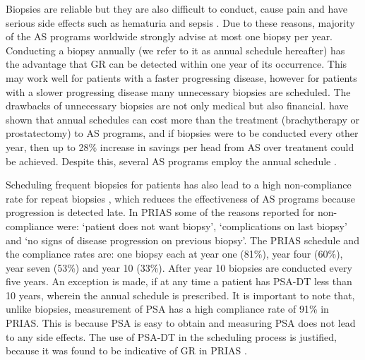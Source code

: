 Biopsies are reliable but they are also difficult to conduct, cause pain and have serious side effects such as hematuria and sepsis \citep{loeb2013systematic}. Due to these reasons, majority of the AS programs worldwide strongly advise at most one biopsy per year. Conducting a biopsy annually (we refer to it as annual schedule hereafter) has the advantage that GR can be detected within one year of its occurrence. This may work well for patients with a faster progressing disease, however for patients with a slower progressing disease many unnecessary biopsies are scheduled. The drawbacks of unnecessary biopsies are not only medical but also financial. \citet{keegan2012active} have shown that annual schedules can cost more than the treatment (brachytherapy or prostatectomy) to AS programs, and if biopsies were to be conducted every other year, then up to 28\% increase in savings per head from AS over treatment could be achieved. Despite this, several AS programs employ the annual schedule \citep{tosoian2011active,welty2015extended}.

Scheduling frequent biopsies for patients has also lead to a high non-compliance rate for repeat biopsies \citep{bokhorst2015compliance}, which reduces the effectiveness of AS programs because progression is detected late. In PRIAS some of the reasons reported for non-compliance were: \textquoteleft patient does not want biopsy\textquoteright, \textquoteleft complications on last biopsy\textquoteright{} and \textquoteleft no signs of disease progression on previous biopsy\textquoteright. The PRIAS schedule and the compliance rates are: one biopsy each at year one (81\%), year four (60\%), year seven (53\%) and year 10 (33\%). After year 10 biopsies are conducted every five years. An exception is made, if at any time a patient has PSA-DT less than 10 years, wherein the annual schedule is prescribed. It is important to note that, unlike biopsies, measurement of PSA has a high compliance rate of 91\% in PRIAS. This is because PSA is easy to obtain and measuring PSA does not lead to any side effects. The use of PSA-DT in the scheduling process is justified, because it was found to be indicative of GR in PRIAS \citep{bokhorst2015compliance}. 

